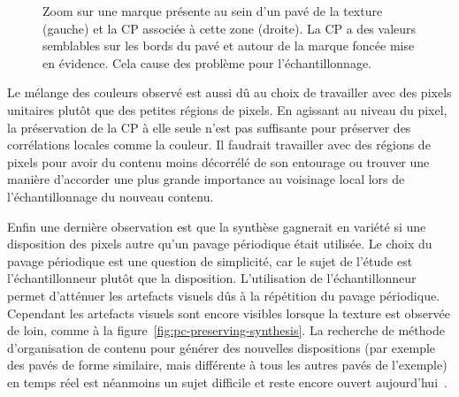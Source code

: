\begin{figure}
    \caption[Problème d'échantillonnage dû à la présence de marques au sein des pavés de la texture]{Zoom sur une marque présente au sein d'un pavé de la texture (gauche) et la CP associée à cette zone (droite). La CP a des valeurs semblables sur les bords du pavé et autour de la marque foncée mise en évidence. Cela cause des problème pour l'échantillonnage.}
    \label{fig:pc-defect}
\end{figure}

Le mélange des couleurs observé est aussi dû au choix de travailler avec des pixels unitaires plutôt que des petites régions de pixels. En agissant au niveau du pixel, la préservation de la CP à elle seule n'est pas suffisante pour préserver des corrélations locales comme la couleur. Il faudrait travailler avec des régions de pixels pour avoir du contenu moins décorrélé de son entourage ou trouver une manière d'accorder une plus grande importance au voisinage local lors de l'échantillonnage du nouveau contenu.

\bigskip

Enfin une dernière observation est que la synthèse gagnerait en variété si une disposition des pixels autre qu'un pavage périodique était utilisée. Le choix du pavage périodique est une question de simplicité, car le sujet de l'étude est l'échantillonneur plutôt que la disposition. L'utilisation de l'échantillonneur permet d'atténuer les artefacts visuels dûs à la répétition du pavage périodique. Cependant les artefacts visuels sont encore visibles lorsque la texture est observée de loin, comme à la figure~\ref{fig:pc-preserving-synthesis}. La recherche de méthode d'organisation de contenu pour générer des nouvelles dispositions (par exemple des pavés de forme similaire, mais différente à tous les autres pavés de l'exemple) en temps réel est néanmoins un sujet difficile et reste encore ouvert aujourd'hui~\cite{baldi_differentiable_2023, guehl_semi-procedural_2020}.